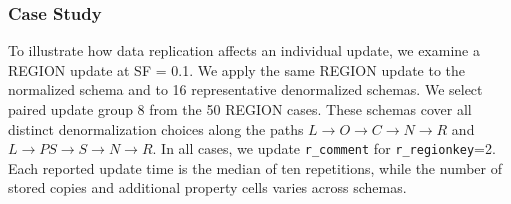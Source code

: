 \documentclass[sigconf]{acmart}
\begin{document}
\subsubsection{Case Study}
To illustrate how data replication affects an individual update, we examine a
REGION update at SF = 0.1. We apply the same REGION update to the normalized
schema and to 16 representative denormalized schemas. We select paired update
group 8 from the 50 REGION cases. These schemas cover all distinct
denormalization choices along
the paths $L\rightarrow O\rightarrow C\rightarrow N\rightarrow R$ and
$L\rightarrow PS\rightarrow S\rightarrow N\rightarrow R$. In all cases, we
update \texttt{r\_comment} for \texttt{r\_regionkey}=2. Each reported update
time is the median of ten repetitions, while the number of stored copies and
additional property cells varies across schemas.
\end{document}
